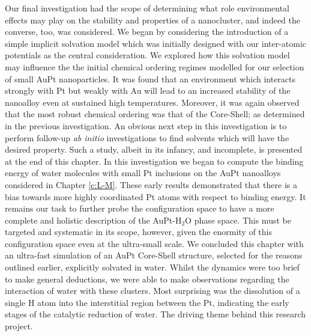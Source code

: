 Our final investigation had the scope of determining what role environmental effects may play on the stability and properties of a nanocluster, and indeed the converse, too, was considered. We began by considering the introduction of a simple implicit solvation model which was initially designed with our inter-atomic potentials as the central consideration. We explored how this solvation model may influence the the initial chemical ordering regimes modelled for our selection of small AuPt nanoparticles. It was found that an environment which interacts strongly with Pt but weakly with Au will lead to an increased stability of the nanoalloy even at sustained high temperatures. Moreover, it was again observed that the most robust chemical ordering was that of the Core-Shell; as determined in the previous investigation. An obvious next step in this investigation is to perform follow-up \textit{ab initio} investigations to find solvents which will have the desired property. Such a study, albeit in its infancy, and incomplete, is presented at the end of this chapter. In this investigation we began to compute the binding energy of water molecules with small Pt inclusions on the AuPt nanoalloys considered in Chapter \ref{c:L-M}. These early results demonstrated that there is a bias towards more highly coordinated Pt atoms with respect to binding energy. It remains our task to further probe the configuration space to have a more complete and holistic description of the AuPt-H$_{2}$O phase space. This must be targeted and systematic in its scope, however, given the enormity of this configuration space even at the ultra-small scale. We concluded this chapter with an ultra-fast simulation of an AuPt Core-Shell structure, selected for the reasons outlined earlier, explicitly solvated in water. Whilst the dynamics were too brief to make general deductions, we were able to make observations regarding the interaction of water with these clusters. Most surprising was the dissolution of a single H atom into the interstitial region between the Pt, indicating the early stages of the catalytic reduction of water. The driving theme behind this research project.

